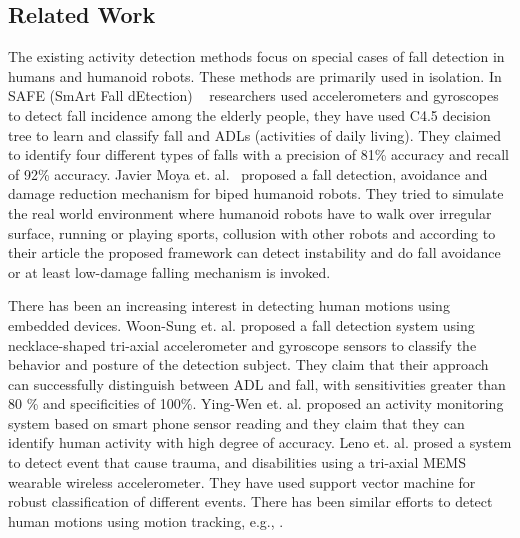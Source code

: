 \documentclass[letterpaper]{article}
\begin{document}
\subsection{Related Work}

The existing activity detection methods focus on special cases of fall detection in humans and 
humanoid robots. These methods are primarily used in isolation.  
In SAFE (SmArt Fall dEtection) {~\cite{ojetola2011fall}} researchers used accelerometers and 
gyroscopes 
to detect fall incidence among the elderly people, they have used C4.5 decision tree to learn and 
classify fall and ADLs (activities of daily living). They claimed to identify four different types 
of falls with a precision of 81\% accuracy and recall of 92\% accuracy.
Javier Moya et. al.{~\cite{moya2014fall}} proposed a fall detection, avoidance and damage reduction 
mechanism for biped humanoid robots. They tried to simulate the real world environment where 
humanoid robots have to walk over irregular surface, running or playing sports, collusion with 
other 
robots and according to their article the proposed framework can detect instability and do fall 
avoidance or at least low-damage falling mechanism is invoked. 

There has been an increasing interest in detecting human motions using embedded devices. Woon-Sung
et. al. \cite{baek2013real} proposed  a fall  detection  system  using necklace-shaped tri-axial
accelerometer  and  gyroscope  sensors  to  classify  the  behavior  and  posture  of  the detection
 subject. They claim that their  approach  can  successfully  distinguish between  ADL and  fall, 
with  sensitivities  greater  than  80 \%  and specificities  of  100\%. Ying-Wen et. al.
\cite{bai2013recognition} proposed an activity monitoring system based on smart phone sensor
reading and they claim that they can identify human activity with high degree of accuracy. Leno et.
al. \cite{leone2013supervised} prosed a system to detect event that cause trauma, and disabilities
using a tri-axial MEMS wearable wireless accelerometer. They have used support vector machine for
robust classification of different events. There has been similar efforts to detect human motions
using motion tracking, e.g., \cite{dumitrache2013fall,kumarwearable,liang2012pre}.
\end{document}
